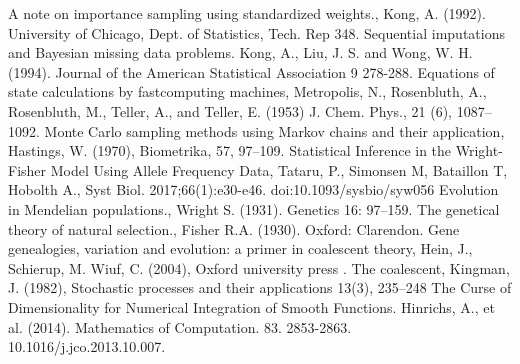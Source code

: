 \documentclass[12pt,mythesisstyle]{report}
\begin{document}
\begin{thebibliography}{99}
	 A note on importance sampling using standardized weights., Kong, A. (1992).  University of Chicago, Dept. of Statistics, Tech. Rep 348.
	 Sequential imputations and Bayesian missing data problems. Kong, A., Liu, J. S. and Wong, W. H. (1994). Journal of the American Statistical Association 9 278-288.
	Equations of state calculations by fastcomputing machines, Metropolis, N., Rosenbluth, A., Rosenbluth, M., Teller, A., and Teller, E. (1953) J. Chem. Phys., 21 (6), 1087–1092.
	 Monte Carlo sampling methods using Markov chains and their application, Hastings, W. (1970), Biometrika, 57, 97–109.
	 Statistical Inference in the Wright-Fisher Model Using Allele Frequency Data, Tataru, P., Simonsen M, Bataillon T, Hobolth A., Syst Biol. 2017;66(1):e30-e46. doi:10.1093/sysbio/syw056
	 Evolution in Mendelian populations., Wright S. (1931).  Genetics 16: 97–159.
	The genetical theory of natural selection., Fisher R.A. (1930). Oxford: Clarendon.
	 Gene genealogies, variation and evolution: a primer in coalescent theory, Hein, J., Schierup, M. Wiuf, C. (2004), Oxford university press .
	 The coalescent, Kingman, J. (1982), Stochastic processes and their applications
	13(3), 235–248
	 The Curse of Dimensionality for Numerical Integration of Smooth Functions. Hinrichs, A., et al. (2014).  Mathematics of Computation. 83. 2853-2863. 10.1016/j.jco.2013.10.007. 

\end{thebibliography}
\end{document}

